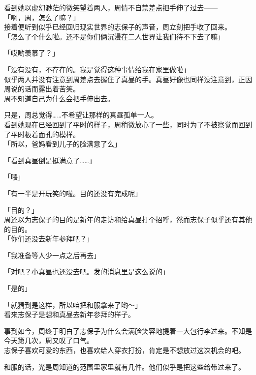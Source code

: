 看到她以虚幻渺茫的微笑望着两人，周情不自禁差点把手伸了过去——\\

「啊，周，怎么了嘛？」\\

接着便听到似乎已经回归现实世界的志保子的声音，周立刻把手收了回来。\\

「怎么了个什么啦。还不是你们俩沉浸在二人世界让我们待不下去了嘛」

「哎哟羡慕了？」

「没有没有，不存在的。我是觉得这种事情给我在家里做啦」\\

似乎两人并没有注意到周差点去握住了真昼的手。真昼好像也同样没注意到，正因周说的话而露出着苦笑。\\

周不知道自己为什么会把手伸出去。

只是，周总觉得……不希望让那样的真昼孤单一人。\\

看到她现在已经回到了平时的样子，周稍微放心了一些，同时为了不被察觉而回到了平时板着面孔的模样。\\

「所以，爸妈看到儿子的脸满意了么」

「看到真昼倒是挺满意了……」

「喂」

「有一半是开玩笑的啦。目的还没有完成呢」

「目的？」\\

周还以为志保子的目的是新年的走访和给真昼打个招呼，然而志保子似乎还有其他的目的。\\

「你们还没去新年参拜吧？」

「我准备等人少一点之后再去」

「对吧？小真昼也还没去吧。发的消息里是这么说的」

「是的」

「就猜到是这样，所以咱把和服拿来了哟～」\\

看来志保子是想和真昼去新年参拜的样子。

事到如今，周终于明白了志保子为什么会满脸笑容地提着一大包行李过来。不知是今天第几次，周又叹了口气。\\

志保子喜欢可爱的东西，也喜欢给人穿衣打扮，肯定是不想放过这次机会的吧。

和服的话，光是周知道的范围里家里就有几件。他们似乎是把这些给带过来了。\\

